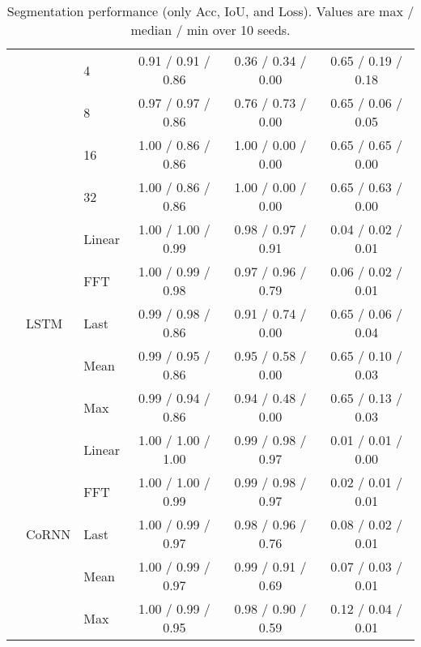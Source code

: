 \begin{table*}[ht!]
\begin{minipage}{0.99\linewidth}
\begin{tabular}{lllccc}
 &  & 4 
 & 0.91 / 0.91 / 0.86 
 & 0.36 / 0.34 / 0.00 
 & 0.65 / 0.19 / 0.18 
\\
 &  & 8 
 & 0.97 / 0.97 / 0.86 
 & 0.76 / 0.73 / 0.00 
 & 0.65 / 0.06 / 0.05 
\\
 &  & 16 
 & 1.00 / 0.86 / 0.86 
 & 1.00 / 0.00 / 0.00 
 & 0.65 / 0.65 / 0.00 
\\
 &  & 32 
 & 1.00 / 0.86 / 0.86 
 & 1.00 / 0.00 / 0.00 
 & 0.65 / 0.63 / 0.00 
\\
\cline{2-6}
 & \multirow{5}{*}{LSTM} 
 & Linear 
 & 1.00 / 1.00 / 0.99 
 & 0.98 / 0.97 / 0.91 
 & 0.04 / 0.02 / 0.01 
\\
 &  & FFT 
 & 1.00 / 0.99 / 0.98 
 & 0.97 / 0.96 / 0.79 
 & 0.06 / 0.02 / 0.01 
\\
 &  & Last 
 & 0.99 / 0.98 / 0.86 
 & 0.91 / 0.74 / 0.00 
 & 0.65 / 0.06 / 0.04 
\\
 &  & Mean 
 & 0.99 / 0.95 / 0.86 
 & 0.95 / 0.58 / 0.00 
 & 0.65 / 0.10 / 0.03 
\\
 &  & Max 
 & 0.99 / 0.94 / 0.86 
 & 0.94 / 0.48 / 0.00 
 & 0.65 / 0.13 / 0.03 
\\
\cline{2-6}
 & \multirow{5}{*}{CoRNN} 
 & Linear 
 & 1.00 / 1.00 / 1.00 
 & 0.99 / 0.98 / 0.97 
 & 0.01 / 0.01 / 0.00 
\\
 &  & FFT 
 & 1.00 / 1.00 / 0.99 
 & 0.99 / 0.98 / 0.97 
 & 0.02 / 0.01 / 0.01 
\\
 &  & Last 
 & 1.00 / 0.99 / 0.97 
 & 0.98 / 0.96 / 0.76 
 & 0.08 / 0.02 / 0.01 
\\
 &  & Mean 
 & 1.00 / 0.99 / 0.97 
 & 0.99 / 0.91 / 0.69 
 & 0.07 / 0.03 / 0.01 
\\
 &  & Max 
 & 1.00 / 0.99 / 0.95 
 & 0.98 / 0.90 / 0.59 
 & 0.12 / 0.04 / 0.01 
\\
\bottomrule
\end{tabular}
\caption{Segmentation performance (only Acc, IoU, and Loss). 
Values are max / median / min over 10 seeds.}
\label{tab:max_min}
\end{minipage}
\end{table*}


